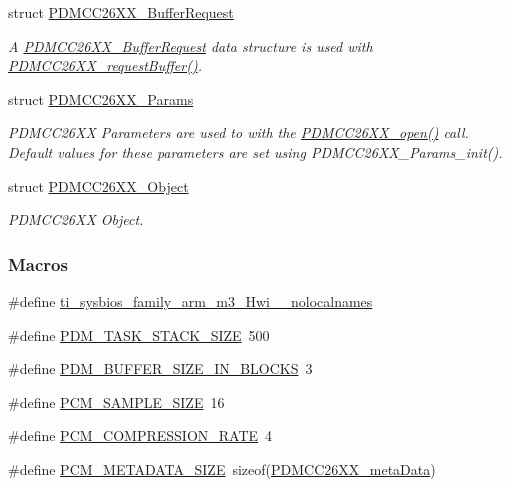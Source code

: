 \begin{DoxyCompactItemize}
struct \hyperlink{struct_p_d_m_c_c26_x_x___buffer_request}{P\+D\+M\+C\+C26\+X\+X\+\_\+\+Buffer\+Request}
\begin{DoxyCompactList}\small\item\em A \hyperlink{struct_p_d_m_c_c26_x_x___buffer_request}{P\+D\+M\+C\+C26\+X\+X\+\_\+\+Buffer\+Request} data structure is used with \hyperlink{_p_d_m_c_c26_x_x_8h_a15a0017513c13ca244f7e3a0f5761e8d}{P\+D\+M\+C\+C26\+X\+X\+\_\+request\+Buffer()}. \end{DoxyCompactList}\item 
struct \hyperlink{struct_p_d_m_c_c26_x_x___params}{P\+D\+M\+C\+C26\+X\+X\+\_\+\+Params}
\begin{DoxyCompactList}\small\item\em P\+D\+M\+C\+C26\+X\+X Parameters are used to with the \hyperlink{_p_d_m_c_c26_x_x_8h_a431d9b71e0d0eebd5ab85960f1c82ee0}{P\+D\+M\+C\+C26\+X\+X\+\_\+open()} call. Default values for these parameters are set using P\+D\+M\+C\+C26\+X\+X\+\_\+\+Params\+\_\+init(). \end{DoxyCompactList}\item 
struct \hyperlink{struct_p_d_m_c_c26_x_x___object}{P\+D\+M\+C\+C26\+X\+X\+\_\+\+Object}
\begin{DoxyCompactList}\small\item\em P\+D\+M\+C\+C26\+X\+X Object. \end{DoxyCompactList}\end{DoxyCompactItemize}
\subsubsection*{Macros}
\begin{DoxyCompactItemize}
\item 
\#define \hyperlink{_p_d_m_c_c26_x_x_8h_aaa17ecf48f5762e2e1bdb0bab8aacf0c}{ti\+\_\+sysbios\+\_\+family\+\_\+arm\+\_\+m3\+\_\+\+Hwi\+\_\+\+\_\+nolocalnames}
\item 
\#define \hyperlink{_p_d_m_c_c26_x_x_8h_adc205204f69ea867c95b30efe1530746}{P\+D\+M\+\_\+\+T\+A\+S\+K\+\_\+\+S\+T\+A\+C\+K\+\_\+\+S\+I\+Z\+E}~500
\item 
\#define \hyperlink{_p_d_m_c_c26_x_x_8h_ac27121ab901a1442bbebbdac45fce296}{P\+D\+M\+\_\+\+B\+U\+F\+F\+E\+R\+\_\+\+S\+I\+Z\+E\+\_\+\+I\+N\+\_\+\+B\+L\+O\+C\+K\+S}~3
\item 
\#define \hyperlink{_p_d_m_c_c26_x_x_8h_a77f1de681b5b50d6e6db60818b5a481d}{P\+C\+M\+\_\+\+S\+A\+M\+P\+L\+E\+\_\+\+S\+I\+Z\+E}~16
\item 
\#define \hyperlink{_p_d_m_c_c26_x_x_8h_a98722a106401368b0df3e68c19c7edd3}{P\+C\+M\+\_\+\+C\+O\+M\+P\+R\+E\+S\+S\+I\+O\+N\+\_\+\+R\+A\+T\+E}~4
\item 
\#define \hyperlink{_p_d_m_c_c26_x_x_8h_ae553576c451c4277d4496b5fe7f26e24}{P\+C\+M\+\_\+\+M\+E\+T\+A\+D\+A\+T\+A\+\_\+\+S\+I\+Z\+E}~sizeof(\hyperlink{struct_p_d_m_c_c26_x_x__meta_data}{P\+D\+M\+C\+C26\+X\+X\+\_\+meta\+Data})
\end{DoxyCompactItemize}
